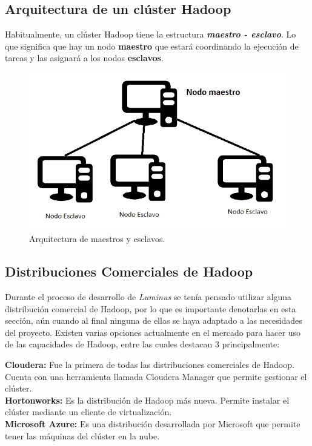 \newpage
\subsection{Arquitectura de un clúster Hadoop}
Habitualmente, un clúster Hadoop tiene la estructura \textbf{\emph{maestro - esclavo}}. Lo que significa que hay un nodo \textbf{maestro} que estará coordinando la ejecución de tareas y las asignará a los nodos \textbf{esclavos}.\\

\begin{figure}[H]
	\begin{center}
		\hypertarget{fig:arquitecturaMaestroEsclavo}{\hspace{1pt}}
		\includegraphics{capitulo2/images/arquitecturaMaestroEsclavo.png}
		\caption{Arquitectura de maestros y esclavos.}
		\label{fig:arquitecturaMaestroEsclavo}
	\end{center}
\end{figure}

\subsection{Distribuciones Comerciales de Hadoop}
Durante el proceso de desarrollo de \emph{Luminus} se tenía pensado utilizar alguna distribución comercial de Hadoop, por lo que es importante denotarlas en esta sección, aún cuando al final ninguna de ellas se haya adaptado a las necesidades del proyecto. Existen varias opciones actualmente en el mercado para hacer uso de las capacidades de Hadoop, entre las cuales destacan 3 principalmente\cite{distH}:\\

\begin{UClist}
	\UCli \textbf{Cloudera:} Fue la primera de todas las distribuciones comerciales de Hadoop. Cuenta con una herramienta llamada Cloudera Manager que permite gestionar el clúster.\\
	\UCli \textbf{Hortonworks:} Es la distribución de Hadoop más nueva. Permite instalar el clúster mediante un cliente de virtualización.\\
	\UCli \textbf{Microsoft Azure:} Es una distribución desarrollada por Microsoft que permite tener las máquinas del clúster en la nube.\\
\end{UClist}

